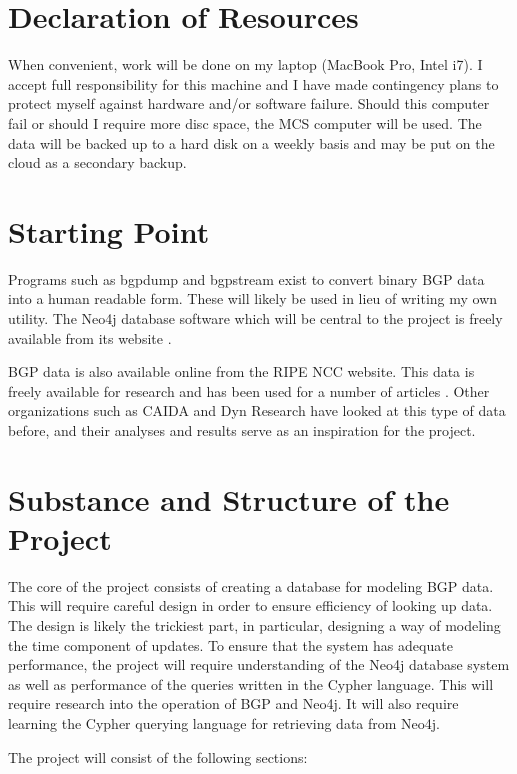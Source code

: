 \documentclass[12pt,a4paper,twoside]{article}
\begin{document}
\section*{Declaration of Resources}

When convenient, work will be done on my laptop (MacBook Pro, Intel i7). I accept full responsibility for this machine and I have made contingency plans to protect myself against hardware and/or software failure. Should this computer fail or should I require more disc space, the MCS computer will be used. The data will be backed up to a hard disk on a weekly basis and may be put on the cloud as a secondary backup. 

\section*{Starting Point}

Programs such as bgpdump and bgpstream exist to convert binary BGP data into a human readable form. These will likely be used in lieu of writing my own utility.  The Neo4j database software which will be central to the project is freely available from its website \cite{neo4j}.

BGP data is also available online from the RIPE NCC website. This data is freely available for research and has been used for a number of articles \cite{ripeart}. Other organizations such as CAIDA \cite{caida} and Dyn Research \cite{dynresearch} have looked at this type of data before, and their analyses and results serve as an inspiration for the project.

\section*{Substance and Structure of the Project}

The core of the project consists of creating a database for modeling BGP data. This will require careful design in order to ensure efficiency of looking up data. The design is likely the trickiest part, in particular, designing a way of modeling the time component of updates. To ensure that the system has adequate performance, the project will require understanding of the Neo4j database system as well as performance of the queries written in the Cypher language. This will require research into the operation of BGP and Neo4j. It will also require learning the Cypher querying language for retrieving data from Neo4j. 

The project will consist of the following sections:
\end{document}
